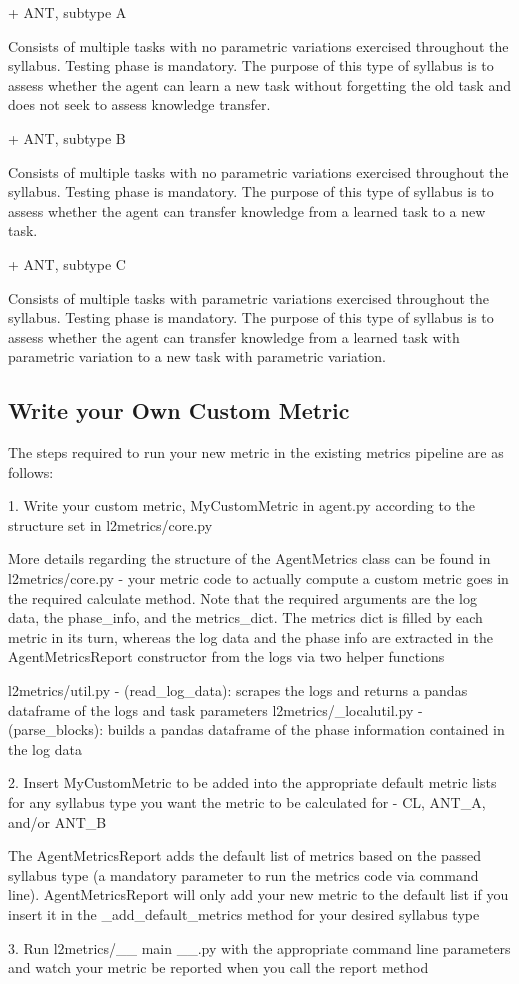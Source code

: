     + ANT, subtype A

    Consists of multiple tasks with no parametric variations exercised throughout the syllabus. Testing phase is mandatory.
    The purpose of this type of syllabus is to assess whether the agent can learn a new task without forgetting the old task
    and does not seek to assess knowledge transfer.

    + ANT, subtype B

    Consists of multiple tasks with no parametric variations exercised throughout the syllabus. Testing phase is mandatory.
    The purpose of this type of syllabus is to assess whether the agent can transfer knowledge from a learned task to a new task.
    
    + ANT, subtype C

    Consists of multiple tasks with parametric variations exercised throughout the syllabus. Testing phase is mandatory.
    The purpose of this type of syllabus is to assess whether the agent can transfer knowledge from a learned task with 
    parametric variation to a new task with parametric variation.

\subsection*{Write your Own Custom Metric}

The steps required to run your new metric in the existing metrics pipeline are as follows:

1. Write your custom metric, MyCustomMetric in agent.py according to the structure set in l2metrics/core.py

    More details regarding the structure of the AgentMetrics class can be found in l2metrics/core.py - your metric code to 
    actually compute a custom metric goes in the required calculate method. Note that the required arguments are the log data,
    the phase\_info, and the metrics\_dict. The metrics dict is filled by each metric in its turn, whereas the log data and the
    phase info are extracted in the AgentMetricsReport constructor from the logs via two helper functions
    
    l2metrics/util.py - (read\_log\_data): scrapes the logs and returns a pandas dataframe of the logs and task parameters
    l2metrics/\_localutil.py - (parse\_blocks): builds a pandas dataframe of the phase information contained in the log data


2. Insert MyCustomMetric to be added into the appropriate default metric lists for any syllabus type you want the metric
to be calculated for - CL, ANT\_A, and/or ANT\_B

    The AgentMetricsReport adds the default list of metrics based on the passed syllabus type (a mandatory parameter to run 
    the metrics code via command line). AgentMetricsReport will only add your new metric to the default list if you insert 
    it in the \_add\_default\_metrics method for your desired syllabus type

3. Run l2metrics/\_\_ main \_\_.py with the appropriate command line parameters and watch your metric be reported when you 
call the report method
